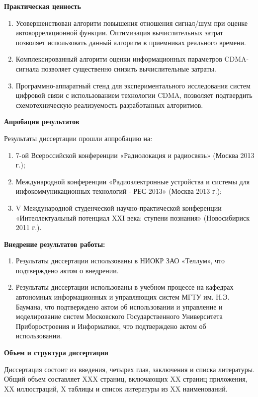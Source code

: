 {\bf{Практическая ценность}}
\begin{enumerate}
	\item {Усовершенствован алгоритм повышения отношения сигнал/шум при оценке автокорреляционной функции. Оптимизация вычислительных затрат позволяет использовать
		данный алгоритм в приемниках реального времени.}
	\item {Комплексированный алгоритм оценки информационных параметров CDMA-сигнала позволяет существенно снизить вычислительные затраты.}
	\item {Программно-аппаратный стенд для экспериментального исследования систем цифровой связи с использованием технологии CDMA,
		позволяет подтвердить схемотехническую реализуемость разработанных алгоритмов.}
\end{enumerate}

{\bf{Апробация результатов}}

Результаты диссертации прошли аппробацию на:
\begin{enumerate}
	\item 7-ой Всероссийской конференции «Радиолокация и радиосвязь» (Москва 2013 г.);
	\item Международной конференции «Радиоэлектронные устройства и системы для инфокоммуникационных технологий - РЕС-2013» (Москва 2013 г.);
	\item V Международной студенческой научно-практической конференции «Интеллектуальный потенциал XXI века: ступени познания» (Новосибириск 2011 г.).
\end{enumerate}

{\bf{Внедрение результатов работы:}}
\begin{enumerate}
	\item Результаты диссертации использованы в НИОКР ЗАО «Теллум», что подтверждено актом о внедрении.
	\item Результаты диссертации использованы в учебном процессе на кафедрах автономных информационных и управляющих систем МГТУ им. Н.Э. Баумана,
		что подтверждено актом об использовании и управление и моделирование систем Московского Государственного Университета Приборостроения
		и Информатики, что подтверждено актом об использовании.
\end{enumerate}

{\bf{Объем и структура диссертации}}

Диссертация состоит из введения, четырех глав, заключения и списка литературы. Общий объем составляет XXX страниц, включающих XX страниц приложения, XX иллюстраций,
X таблицы и список литературы из XX наименований.

